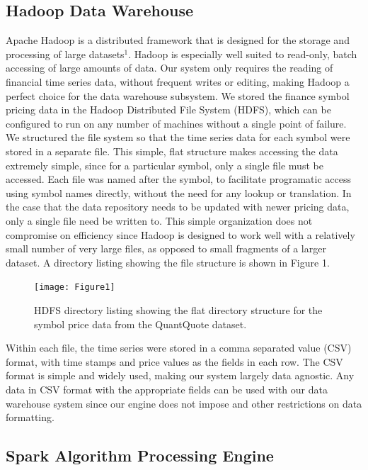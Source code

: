 \documentclass[10pt, conference, compsocconf]{IEEEtran}
\begin{document}
\subsection{Hadoop Data Warehouse}
Apache Hadoop is a distributed framework that is designed for the storage and processing of large datasets$^{1}$. Hadoop is especially well suited to read-only, batch accessing of large amounts of data. Our system only requires the reading of financial time series data, without frequent writes or editing, making Hadoop a perfect choice for the data warehouse subsystem. We stored the finance symbol pricing data in the Hadoop Distributed File System (HDFS), which can be configured to run on any number of machines without a single point of failure. We structured the file system so that the time series data for each symbol were stored in a separate file. This simple, flat structure makes accessing the data extremely simple, since for a particular symbol, only a single file must be accessed. Each file was named after the symbol, to facilitate programatic access using symbol names directly, without the need for any lookup or translation. In the case that the data repository needs to be updated with newer pricing data, only a single file need be written to. This simple organization does not compromise on efficiency since Hadoop is designed to work well with a relatively small number of very large files, as opposed to small fragments of a larger dataset. A directory listing showing the file structure is shown in Figure 1. 

\begin{figure}
  \texttt{[image: Figure1]}
  \caption{HDFS directory listing showing the flat directory structure for the symbol price data from the QuantQuote dataset.}
\end{figure}

Within each file, the time series were stored in a comma separated value (CSV) format, with time stamps and price values as the fields in each row. The CSV format is simple and widely used, making our system largely data agnostic. Any data in CSV format with the appropriate fields can be used with our data warehouse system since our engine does not impose and other restrictions on data formatting. 

\subsection{Spark Algorithm Processing Engine}
\end{document}
